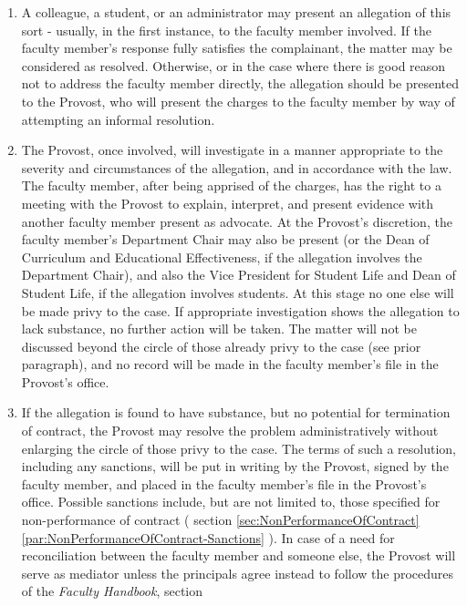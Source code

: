 					\begin{enumerate}[label=\alph*)]
						\item{
							\label{par:ViolationOfContractProcedures-Allegation}
							A colleague, a student, or an administrator may present an allegation of this sort - usually, in the first instance, to the faculty member involved.  If the faculty member's response fully satisfies the complainant, the matter may be considered as resolved.  Otherwise, or in the case where there is good reason not to address the faculty member directly, the allegation should be presented to the Provost, who will present the charges to the faculty member by way of attempting an informal resolution.}
						\item{The Provost, once involved, will investigate in a manner appropriate to the severity and circumstances of the allegation, and in accordance with the law.  The faculty member, after being apprised of the charges, has the right to a meeting with the Provost to explain, interpret, and present evidence with another faculty member present as advocate.  At the Provost's discretion, the faculty member's Department Chair may also be present (or the Dean of Curriculum and Educational Effectiveness, if the allegation involves the Department Chair), and also the Vice President for Student Life and Dean of Student Life, if the allegation involves students.  At this stage no one else will be made privy to the case.}
						If appropriate investigation shows the allegation to lack substance, no further action will be taken.  The matter will not be discussed beyond the circle of those already privy to the case (see prior paragraph), and no record will be made in the faculty member's file in the Provost's office.
						\item{If the allegation is found to have substance, but no potential for termination of contract, the Provost may resolve the problem administratively without enlarging the circle of those privy to the case.  The terms of such a resolution, including any sanctions, will be put in writing by the Provost, signed by the faculty member, and placed in the faculty member's file in the Provost's office.  Possible sanctions include, but are not limited to, those specified for non-performance of contract (
							section
							\ref{sec:NonPerformanceOfContract}
							\ref{par:NonPerformanceOfContract-Sanctions}
							).  In case of a need for reconciliation between the faculty member and someone else, the Provost will serve as mediator unless the principals agree instead to follow the procedures of the \emph{Faculty Handbook}, section
}
\end{enumerate}
